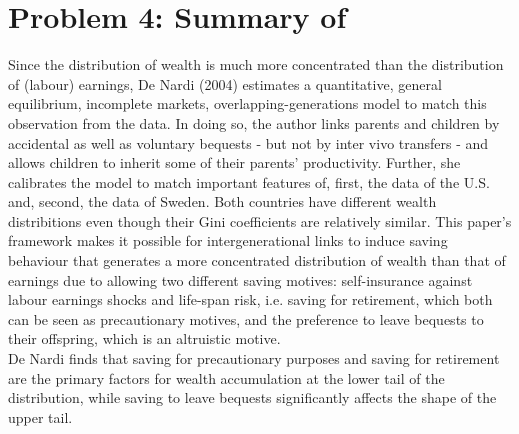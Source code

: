 \documentclass[12pt,a4paper]{article}
\begin{document}
\section*{Problem 4: Summary of \cite{de2004wealth}}
Since the distribution of wealth is much more concentrated than the distribution of (labour) earnings, De Nardi (2004) estimates a quantitative, general equilibrium, incomplete markets, overlapping-generations model to match this observation from the data. In doing so, the author links parents and children by accidental as well as voluntary bequests - but not by inter vivo transfers - and allows children to inherit some of their parents' productivity. Further, she calibrates the model to match important features of, first, the data of the U.S. and, second, the data of Sweden. Both countries have different wealth distribitions even though their Gini coefficients are relatively similar. This paper's framework makes it possible for intergenerational links to induce saving behaviour that generates a more concentrated distribution of wealth than that of earnings due to allowing two different saving motives: self-insurance against labour earnings shocks and life-span risk, i.e. saving for retirement, which both can be seen as precautionary motives, and the preference to leave bequests to their offspring, which is an altruistic motive.
\\
De Nardi finds that saving for precautionary purposes and saving for retirement are the primary factors for wealth accumulation at the lower tail of the distribution, while saving to leave bequests significantly affects the shape of the upper tail.

\pagebreak



\pagebreak


\end{document}
